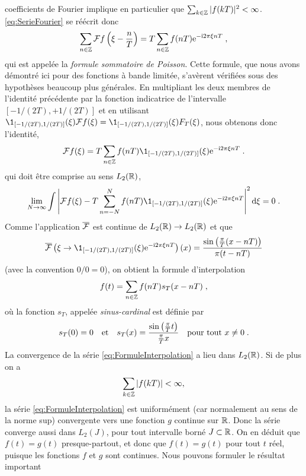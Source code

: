 coefficients de Fourier implique en particulier que $\sum_{k \in \mathbb{Z}} |f(kT)|^2 < \infty$. \eqref{eq:SerieFourier} se r{\'e}{\'e}crit donc
\begin{equation}
\label{eq:FormuleSommatoirePoisson}
\sum_{n \in \mathbb{Z}} \mathcal{F} f \left( \xi - \frac{n}{T} \right)  = T \sum_{n \in \mathbb{Z}} f(nT) \mathrm{e}^{- \mathrm{i} 2 \pi \xi n T}\;,
\end{equation}
qui est appel{\'e}e la \emph{formule sommatoire de Poisson}. Cette formule, que nous avons d{\'e}montr{\'e} ici pour des fonctions {\`a} bande limit{\'e}e, s'av{\`e}rent v{\'e}rifi{\'e}es
sous des hypoth{\`e}ses beaucoup plus g{\'e}n{\'e}rales. En multipliant les deux membres de l'identit{\'e} pr{\'e}c{\'e}dente par la fonction indicatrice de l'intervalle
$[-1/(2T),+1/(2T)]$ et en utilisant $\1_{[-1/(2T),1/(2T)]}(\xi) \TF f (\xi)= \1_{[-1/(2T),1/(2T)]}(\xi) F_T(\xi)$,
nous obtenons donc l'identit{\'e},
$$
\TF f (\xi) = T \sum_{n \in \zset} f(nT) \1_{[-1/(2T),1/(2T)]}(\xi) \rme^{- \rmi 2 \pi \xi n T} \eqsp.
$$
qui doit {\^e}tre comprise au sens $L_2(\mathbb{R})$,
$$
\lim_{N \to \infty} \int \left| \TF f(\xi)  - T \sum_{n =-N}^N f(nT) \1_{[-1/(2T),1/(2T)]}(\xi) \rme^{- \rmi 2 \pi
    \xi n T}  \right|^2 \rmd \xi = 0 \eqsp.
$$
Comme l'application $\overline{\mathcal{F}}$ est continue de $L_2(\mathbb{R}) \to L_2(\mathbb{R})$ et que
$$
\TFAC{\xi \to \1_{[-1/(2T),1/(2T)]}(\xi) \rme^{- \rmi 2 \pi \xi n T}}(x)= \frac{\sin\left( \frac{\pi}{T}(x - nT)\right)}{\pi(t-nT)}
$$
(avec la convention $0/0=0$), on obtient la formule d'interpolation
\begin{equation}
\label{eq:FormuleInterpolation}
f(t) = \sum_{n \in \mathbb{Z}} f(nT) s_T(x-nT)  \;,
\end{equation}
o{\`u} la fonction $s_T$, appel{\'e}e \emph{sinus-cardinal} est d{\'e}finie par
\begin{equation}
\label{eq:SinusCardinal}
s_T(0)=0\quad\text{et}\quad s_T(x) = \frac{\sin \left( \frac{\pi}{T} t\right) }{ \frac{\pi}{T} x}\quad\text{pour tout $x\neq0$} \;.
\end{equation}
La convergence de la s{\'e}rie \eqref{eq:FormuleInterpolation} a lieu dans $L_2(\mathbb{R})$. Si de plus on a
$$
\sum_{k \in \mathbb{Z}} |f(kT)| < \infty,
$$
la s{\'e}rie \eqref{eq:FormuleInterpolation} est uniform{\'e}ment (car normalement au sens de la norme sup) convergente vers une
fonction $g$ continue sur $\mathbb{R}$. Donc la
s{\'e}rie converge aussi dans $L_2(J)$, pour tout intervalle born{\'e} $J \subset \mathbb{R}$. On en d{\'e}duit que $f(t)= g(t)$ presque-partout, et donc que $f(t)= g(t)$
pour tout $t$ r{\'e}el, puisque les fonctions $f$ et $g$ sont continues. Nous pouvons formuler le r{\'e}sultat important
